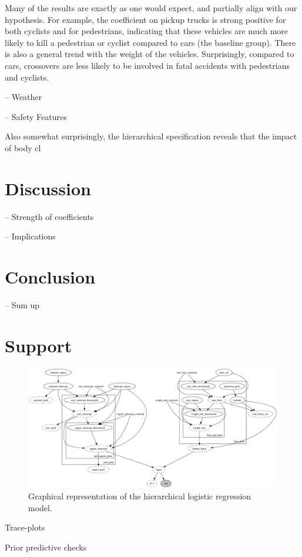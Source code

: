 \documentclass[12pt]{article}
\begin{document}
Many of the results are exactly as one would expect, and partially align with our hypothesis. For example, the 
coefficient on pickup trucks is strong positive for both cyclists and for pedestrians, indicating that these vehicles
are much more likely to kill a pedestrian or cyclist compared to cars (the baseline group). There is also a general 
trend with the weight of the vehicles. Surprisingly, compared to cars, crossovers are less likely to be 
involved in fatal accidents with pedestrians and cyclists. 

-- Weather


-- Safety Features


Also somewhat surprisingly, the hierarchical specification 
reveals that the impact of body cl


\section{Discussion}

-- Strength of coefficients

-- Implications

\section{Conclusion}

-- Sum up

\section{Support}

\begin{figure}
    \centering
    \includegraphics[width=\textwidth]{images/model_graph.png}
    \caption{Graphical representation of the hierarchical logistic regression model.}
    \label{fig:model_graph}
\end{figure}

Trace-plots

Prior predictive checks

\printbibliography
\end{document}
